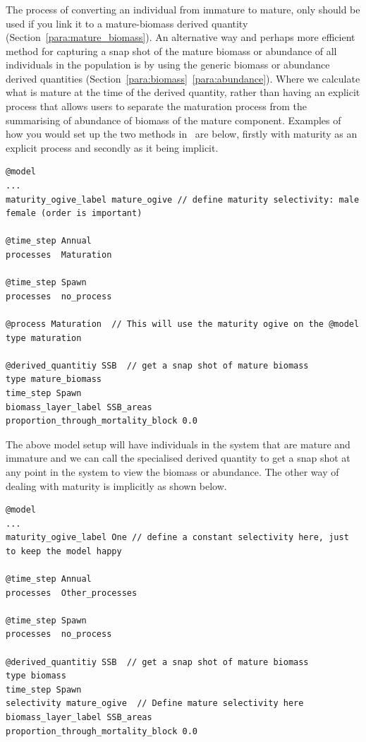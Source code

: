 \subsubsection{}\label{subsubsec:maturity}
The process of converting an individual from immature to mature, only should be used if you link it to a mature-biomass derived quantity (Section~\ref{para:mature_biomass}). An alternative way and perhaps more efficient method for capturing a snap shot of the mature biomass or abundance of all individuals in the population is by using the generic biomass or abundance derived quantities (Section~\ref{para:biomass}~\ref{para:abundance}). Where we calculate what is mature at the time of the derived quantity, rather than having an explicit process that allows users to separate the maturation process from the summarising of abundance of biomass of the mature component. Examples of how you would set up the two methods in \IBM\ are below, firstly with maturity as an explicit process and secondly as it being implicit.

{\small{\begin{verbatim}
@model
...
maturity_ogive_label mature_ogive // define maturity selectivity: male female (order is important)

@time_step Annual
processes  Maturation 

@time_step Spawn
processes  no_process 

@process Maturation  // This will use the maturity ogive on the @model
type maturation

@derived_quantitiy SSB  // get a snap shot of mature biomass
type mature_biomass
time_step Spawn
biomass_layer_label SSB_areas
proportion_through_mortality_block 0.0
\end{verbatim}}}

The above model setup will have individuals in the system that are mature and immature and we can call the specialised  derived quantity to get a snap shot at any point in the system to view the biomass or abundance. The other way of dealing with maturity is implicitly as shown below.

{\small{\begin{verbatim}
@model
...
maturity_ogive_label One // define a constant selectivity here, just to keep the model happy

@time_step Annual
processes  Other_processes

@time_step Spawn
processes  no_process 	
	
@derived_quantitiy SSB  // get a snap shot of mature biomass
type biomass
time_step Spawn
selectivity mature_ogive  // Define mature selectivity here
biomass_layer_label SSB_areas
proportion_through_mortality_block 0.0
\end{verbatim}}}

